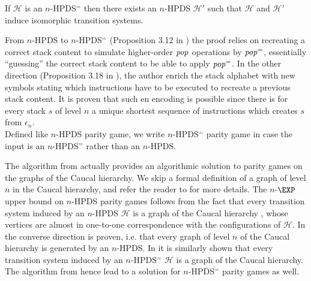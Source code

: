 \documentclass[a4paper,UKenglish,cleveref, autoref, thm-restate]{lipics-v2021}
\renewcommand{\H}{\mathcal{H}}
\begin{document}
\begin{theorem}{\cite{Woeh05, carayol2006automates}}
If $\H$ is an $n$-HPDS$^=$ then there
exists an $n$-HPDS $\H'$ such that
$\H$ and $\H'$ %
induce isomorphic transition systems.
\end{theorem}

\fi

From $n$-HPDS to $n$-HPDS$^=$ (Proposition 3.12 in \cite{Woeh05}) the proof relies on recreating a correct stack content to simulate higher-order 
$\text{\textit{pop}}$ operations by $\text{\textit{pop}}^=$, essentially ``guessing'' the correct stack content to be able to apply $\text{\textit{pop}}^=$. 
In the other direction (Proposition 3.18 in \cite{Woeh05}), 
the author
enrich the stack alphabet with new symbols stating which 
instructions have to be executed to recreate a
previous stack content. It is proven that such en encoding is possible since
there is 
for every stack $s$ of level $n$
 a unique shortest sequence of instructions which creates $s$ from
$\epsilon_n$. \\

Defined like {\sc $n$-HPDS parity game}, we write {\sc $n$-HPDS$^=$ parity game}  
in case the input is an $n$-HPDS$^=$ rather than an $n$-HPDS.



The algorithm from \cite{Cach03} actually provides an algorithmic solution to parity games on the graphs of the Caucal hierarchy. 
We skip a formal definition of a graph of level $n$ in the Caucal hierarchy, and refer the reader
to \cite{Cau02mfcs} for more details.
The $n$-$\EXP$ upper bound on $n$-HPDS parity games follows from the fact that every transition system induced by an $n$-HPDS $\H$ is a graph of the Caucal hierarchy \cite{Cach03, Woeh05},
whose vertices are almost in one-to-one correspondence with the configurations of $\H$.
In \cite{Woeh05} the converse direction is proven, i.e. that every graph of level $n$
of the Caucal hierarchy is generated by an $n$-HPDS.  
%
%
In \cite{carayol2006automates}
it is similarly shown that
every transition system induced by an $n$-HPDS$^=$ $\H$ is a graph of the Caucal hierarchy.
%
%
The algorithm from \cite{Cach03} hence lead to a solution for
$n$-HPDS$^=$ parity games as well.
\end{document}
